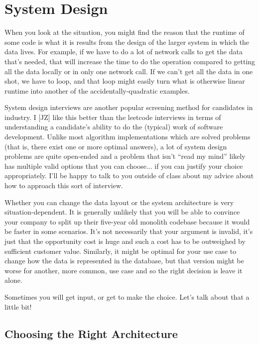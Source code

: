 




\section*{System Design}
When you look at the situation, you might find the reason that the runtime of some code is what it is results from the design of the larger system in which the data lives. For example, if we have to do a lot of network calls to get the data that's needed, that will increase the time to do the operation compared to getting all the data locally or in only one network call. If we can't get all the data in one shot, we have to loop, and that loop might easily turn what is otherwise linear runtime into another of the accidentally-quadratic examples.

System design interviews are another popular screening method for candidates in industry. I [JZ] like this better than the leetcode interviews in terms of understanding a candidate's ability to do the (typical) work of software development. Unlike most algorithm implementations which are solved problems (that is, there exist one or more optimal answers), a lot of system design problems are quite open-ended and a problem that isn't ``read my mind'' likely has multiple valid options that you can choose... if you can justify your choice appropriately. I'll be happy to talk to you outside of class about my advice about how to approach this sort of interview.

Whether you can change the data layout or the system architecture is very situation-dependent. It is generally unlikely that you will be able to convince your company to split up their five-year old monolith codebase because it would be faster in some scenarios. It's not necessarily that your argument is invalid, it's just that the opportunity cost is huge and such a cost has to be outweighed by sufficient customer value. Similarly, it might be optimal for your use case to change how the data is represented in the database, but that version might be worse for another, more common, use case and so the right decision is leave it alone.

Sometimes you will get input, or get to make the choice. Let's talk about that a little bit!

\subsection*{Choosing the Right Architecture}

